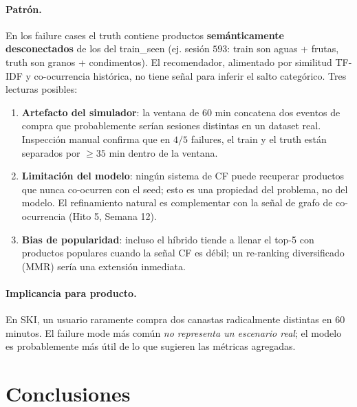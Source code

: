 \documentclass[12pt,a4paper]{article}
\begin{document}
\paragraph{Patrón.} En los failure cases el truth contiene productos \textbf{semánticamente desconectados} de los del train\_seen (ej. sesión $593$: train son aguas + frutas, truth son granos + condimentos). El recomendador, alimentado por similitud TF-IDF y co-ocurrencia histórica, no tiene señal para inferir el salto categórico. Tres lecturas posibles:

\begin{enumerate}
    \item \textbf{Artefacto del simulador}: la ventana de 60 min concatena dos eventos de compra que probablemente serían sesiones distintas en un dataset real. Inspección manual confirma que en $4/5$ failures, el train y el truth están separados por $\geq 35$ min dentro de la ventana.
    \item \textbf{Limitación del modelo}: ningún sistema de CF puede recuperar productos que nunca co-ocurren con el seed; esto es una propiedad del problema, no del modelo. El refinamiento natural es complementar con la señal de grafo de co-ocurrencia (Hito 5, Semana 12).
    \item \textbf{Bias de popularidad}: incluso el híbrido tiende a llenar el top-5 con productos populares cuando la señal CF es débil; un re-ranking diversificado (MMR) sería una extensión inmediata.
\end{enumerate}

\paragraph{Implicancia para producto.} En SKI, un usuario raramente compra dos canastas radicalmente distintas en 60 minutos. El failure mode más común \emph{no representa un escenario real}; el modelo es probablemente más útil de lo que sugieren las métricas agregadas.

\section{Conclusiones}
\end{document}
